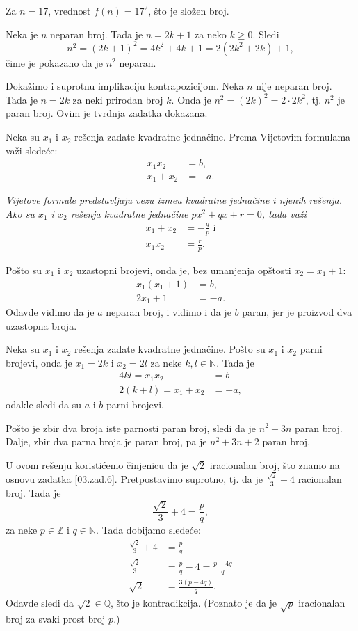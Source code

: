 Za $n=17$, vrednost $f(n)=17^2$, \v sto je slo\v zen broj.

Neka je $n$ neparan broj. Tada je $n=2k+1$ za neko $k\geq 0$. Sledi
\[n^2=(2k+1)^2=4k^2+4k+1=2(2k^2+2k)+1,\]
\v cime je pokazano da je $n^2$ neparan.

Doka\v zimo i suprotnu implikaciju kontrapozicijom. Neka $n$ nije neparan broj. Tada je $n=2k$ za neki prirodan broj $k$. Onda je $n^2=(2k)^2=2\cdot 2k^2$, tj. $n^2$ je paran broj. Ovim je tvrdnja zadatka dokazana.

Neka su $x_1$ i $x_2$ re\v senja zadate kvadratne jedna\v cine. Prema Vijetovim formulama va\v zi slede\' ce:
\begin{align*}
x_1x_2&=b,\\
x_1+x_2&=-a.
\end{align*}
\begin{NAP}\it
Vijetove formule predstavljaju vezu izme\dj u kvadratne jedna\v cine i njenih re\v senja. Ako su $x_1$ i $x_2$ re\v senja kvadratne jedna\v cine $px^2+qx+r=0$, tada va\v zi
\begin{align*}
x_1+x_2&=-\frac qp\text{ i}\\
x_1x_2&=\frac rp.
\end{align*}\end{NAP}
Po\v sto su $x_1$ i $x_2$ uzastopni brojevi, onda je, bez umanjenja op\v stosti $x_2=x_1+1$:
\begin{align*}
x_1(x_1+1)&=b,\\
2x_1+1&=-a.
\end{align*}
Odavde vidimo da je $a$ neparan broj, i vidimo i da je $b$ paran, jer je proizvod dva uzastopna broja.

Neka su $x_1$ i $x_2$ re\v senja zadate kvadratne jedna\v cine. Po\v sto su $x_1$ i $x_2$ parni brojevi, onda je $x_1=2k$ i $x_2=2l$ za neke $k,l\in\mathbb N$. Tada je
\begin{align*}
4kl=x_1x_2&=b\\
2(k+l)=x_1+x_2&=-a,
\end{align*}
odakle sledi da su $a$ i $b$ parni brojevi.

Po\v sto je zbir dva broja iste parnosti paran broj, sledi da je $n^2+3n$ paran broj. Dalje, zbir dva parna broja je paran broj, pa je $n^2+3n+2$ paran broj.

U ovom re\v senju koristi\' cemo \v cinjenicu da je $\sqrt 2$ iracionalan broj, \v sto znamo na osnovu zadatka \ref{03.zad.6}. Pretpostavimo suprotno, tj. da je $\frac{\sqrt 2}3+4$ racionalan broj. Tada je
\[\frac{\sqrt 2}3+4=\frac pq,\]
za neke $p\in\mathbb Z$ i $q\in\mathbb N$. Tada dobijamo slede\' ce:
\begin{align*}
\frac{\sqrt 2}3+4&=\frac pq\\
\frac{\sqrt 2}3&=\frac pq-4=\frac{p-4q}q\\
\sqrt 2&=\frac{3(p-4q)}q.
\end{align*}
Odavde sledi da $\sqrt 2\in\mathbb Q$, \v sto je kontradikcija. (Poznato je da je $\sqrt p$ iracionalan broj za svaki prost broj $p$.)

